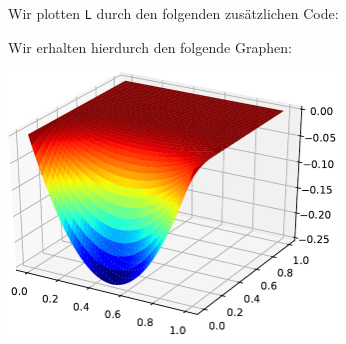 \section{}



\subsection{}

Wir plotten \texttt{L} durch den folgenden zusätzlichen Code:



Wir erhalten hierdurch den folgende Graphen:

\begin{center}
  \includegraphics[width = 0.65\textwidth]{chapter_04/exercise_04_23_figure_1.pdf}
\end{center}



\subsection{}

